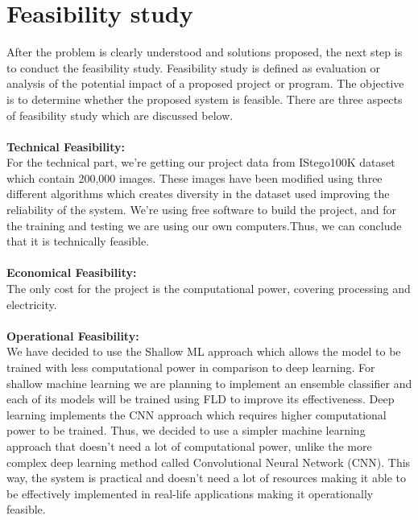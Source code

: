 \chapter{Feasibility study} \sloppy
After the problem is clearly understood and solutions proposed, the next step is to conduct the
feasibility study. Feasibility study is defined as evaluation or analysis of the potential impact
of a proposed project or program. The objective is to determine whether the proposed system
is feasible. There are three aspects of feasibility study which are discussed below.\\ \\
\textbf{Technical Feasibility:}\\For the technical part, we're getting our project data from IStego100K dataset\cite{7} which contain 200,000 images. These images have been modified using three different algorithms which creates diversity in the dataset used improving the reliability of the system. We're using free software to build the project, and for the training and testing we are using our own computers.Thus, we can conclude that it is technically feasible.\\ \\
\textbf{Economical Feasibility:}\\The only cost for the project is the computational power, covering processing and electricity.\\ \\
\textbf{Operational Feasibility:}\\We have decided to use the Shallow ML approach which allows the model to be trained with less computational power in comparison to deep learning. For shallow machine learning we are planning to implement an ensemble classifier and each of its models will be trained using FLD to improve its effectiveness. Deep learning implements the CNN approach which requires higher computational power to be trained. Thus, we decided to use a simpler machine learning approach that doesn't need a lot of computational power, unlike the more complex deep learning method called Convolutional Neural Network (CNN). This way, the system is practical and doesn't need a lot of resources making it able to be effectively implemented in real-life applications making it operationally feasible.
\\